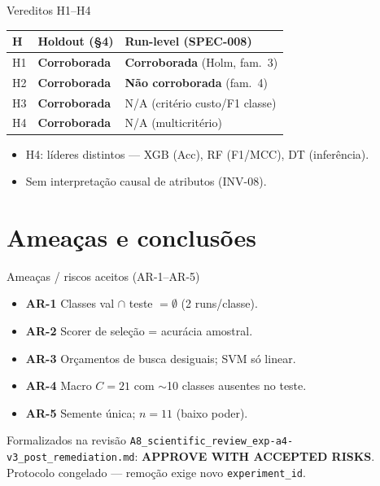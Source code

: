 \documentclass[aspectratio=169,11pt]{beamer}
\begin{document}
\begin{frame}{Vereditos H1--H4}
{\small
\begin{tabular}{lll}
\toprule
H & Holdout (§4) & Run-level (SPEC-008) \\
\midrule
H1 & \textbf{Corroborada} & \textbf{Corroborada} (Holm, fam.\ 3) \\
H2 & \textbf{Corroborada} & \textbf{Não corroborada} (fam.\ 4) \\
H3 & \textbf{Corroborada} & N/A (critério custo/F1 classe) \\
H4 & \textbf{Corroborada} & N/A (multicritério) \\
\bottomrule
\end{tabular}
}
\bigskip
\begin{itemize}
  \item H4: líderes distintos --- XGB (Acc), RF (F1/MCC), DT (inferência).
  \item Sem interpretação causal de atributos (INV-08).
\end{itemize}
\end{frame}

\section{Ameaças e conclusões}
\begin{frame}{Ameaças / riscos aceitos (AR-1--AR-5)}
\begin{itemize}
  \item \textbf{AR-1} Classes val $\cap$ teste $= \emptyset$ (2 runs/classe).
  \item \textbf{AR-2} Scorer de seleção = acurácia amostral.
  \item \textbf{AR-3} Orçamentos de busca desiguais; SVM só linear.
  \item \textbf{AR-4} Macro $C{=}21$ com $\sim$10 classes ausentes no teste.
  \item \textbf{AR-5} Semente única; $n{=}11$ (baixo poder).
\end{itemize}
\bigskip
{\small Formalizados na revisão
\texttt{A8\_scientific\_review\_exp-a4-v3\_post\_remediation.md}:
\textbf{APPROVE WITH ACCEPTED RISKS}. Protocolo congelado --- remoção exige novo
\texttt{experiment\_id}.}
\end{frame}
\end{document}
